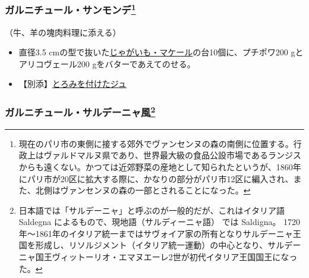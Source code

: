 \begin{recette}
\hypertarget{garniture-saint-mande}{%
\subsubsection[ガルニチュール・サンモンデ]{\texorpdfstring{ガルニチュール・サンモンデ\footnote{現在のパリ市の東側に接する郊外でヴァンセンヌの森の南側に位置する。行政上はヴァルドマルヌ県であり、世界最大級の食品公設市場であるランジスからも遠くない。かつては近郊野菜の産地として知られたというが、1860年にパリ市が20区に拡大する際に、かなりの部分がパリ市12区に編入され、また、北側はヴァンセンヌの森の一部とされることになった。}}{ガルニチュール・サンモンデ}}\label{garniture-saint-mande}}



（牛、羊の塊肉料理に添える）

\begin{itemize}
\item
  直径3.5
  cmの型で抜いた\protect\hyperlink{pommes-de-terre-macaire}{じゃがいも・マケール}の台10個に、プチポワ200
  gとアリコヴェール200 gをバターであえてのせる。
\item
  【別添】\protect\hyperlink{jus-de-veau-lie}{とろみを付けたジュ}
\end{itemize}

\atoaki{}

\hypertarget{garniture-a-la-sarde}{%
\subsubsection[ガルニチュール・サルデーニャ風]{\texorpdfstring{ガルニチュール・サルデーニャ風\footnote{日本語では「サルデーニャ」と呼ぶのが一般的だが、これはイタリア語
  Saldegna によるもので、現地語（サルディーニャ語） では Saldigna。
  1720年〜1861年のイタリア統一まではサヴォイア家の所有となりサルデーニャ王国を形成し、リソルジメント（イタリア統一運動）の中心となり、サルデーニャ国王ヴィットーリオ・エマヌエーレ2世が初代イタリア王国国王になった。}}{ガルニチュール・サルデーニャ風}}\label{garniture-a-la-sarde}}




\end{recette}
